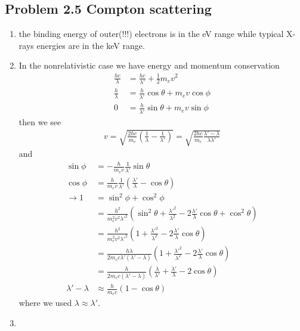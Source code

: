 \documentclass[10pt,a4paper]{book}
\theoremstyle{definition}
\begin{document}
\subsection{Problem 2.5 Compton scattering}
\begin{enumerate}
    \item the binding energy of outer(!!!) electrons is in the eV range while typical X-rays energies are in the keV range.
    \item In the nonrelativistic case we have energy and momentum conservation
    \begin{align}
        \frac{hc}{\lambda}&=\frac{hc}{\lambda'}+\frac{1}{2}m_ev^2\\
        \frac{h}{\lambda}&=\frac{h}{\lambda'}\cos\theta+m_ev\cos\phi\\
        0&=\frac{h}{\lambda'}\sin\theta+m_ev\sin\phi
    \end{align}
    then we see
    \begin{align}
        v=\sqrt{\frac{2hc}{m_e}\left(\frac{1}{\lambda}-\frac{1}{\lambda'}\right)}
        =\sqrt{\frac{2hc}{m_e}\frac{\lambda'-\lambda}{\lambda\lambda'}}
    \end{align}
    and
    \begin{align}
        \sin\phi&=-\frac{h}{m_ev}\frac{1}{\lambda'}\sin\theta\\
        \cos\phi&=\frac{h}{m_ev}\frac{1}{\lambda'}\left(\frac{\lambda'}{\lambda}-\cos\theta\right)\\
        \rightarrow1&=\sin^2\phi+\cos^2\phi\\
        &=\frac{h^2}{m_e^2v^2\lambda'^2}\left(\sin^2\theta+\frac{\lambda'^2}{\lambda^2}-2\frac{\lambda'}{\lambda}\cos\theta+\cos^2\theta\right)\\
        &=\frac{h^2}{m_e^2v^2\lambda'^2}\left(1+\frac{\lambda'^2}{\lambda^2}-2\frac{\lambda'}{\lambda}\cos\theta\right)\\
        &=\frac{h\lambda}{2m_ec\lambda'(\lambda'-\lambda)}\left(1+\frac{\lambda'^2}{\lambda^2}-2\frac{\lambda'}{\lambda}\cos\theta\right)\\
        &=\frac{h}{2m_ec(\lambda'-\lambda)}\left(\frac{\lambda}{\lambda'}+\frac{\lambda'}{\lambda}-2\cos\theta\right)\\
        \lambda'-\lambda&\approx\frac{h}{m_ec}\left(1-\cos\theta\right)
    \end{align}
    where we used $\lambda\approx\lambda'$.
    \item 
\end{enumerate}
    
\end{document}
